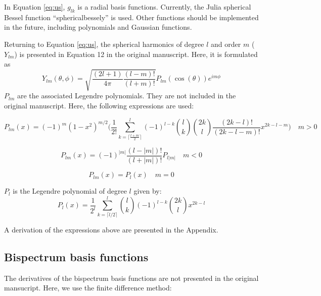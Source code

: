 \documentclass[12pt]{article}
\begin{document}
In Equation \ref{eq:us}, $g_{lk}$ is a radial basis functions. Currently, the Julia spherical Bessel function ``sphericalbessely'' is used. Other functions should be implemented in the future, including polynomials and Gaussian functions.

Returning to Equation \ref{eq:us}, the spherical harmonics of degree $l$ and order $m$ ($Y_{lm}$) is presented in Equation 12 in the original manuscript. Here, it is formulated as
\begin{equation}
 Y_{lm}(\theta,\phi) = \sqrt{\frac{(2l + 1)}{4 \pi} \frac{(l-m)!}{(l+m)!}} P_{lm}(\cos(\theta)) e^{i m \phi}
\end{equation}
$P_{lm}$ are the associated Legendre polynomials. They are not included in the original manuscript. Here, the following expressions are used:

\begin{equation}
    \label{eq:leg4}
    P_{lm}(x) = (-1)^m (1-x^2)^{m/2} \Bigg( \frac{1}{2!} \sum_{k=\lceil \frac{l+m}{2} \rceil}^l  (-1)^{l-k} {l \choose k} {2k \choose l} \frac{(2k-l)!}{(2k-l-m)!} x^{2k-l-m} \Bigg) \quad m >0
\end{equation}

\begin{equation}
    \label{eq:leg2}
    P_{lm} (x) = (-1)^{|m|} \frac{(l-|m|)!}{(l+|m|)!} P_{l|m|} \quad m < 0
\end{equation}

\begin{equation}
    \label{eq:leg5}
    P_{lm}(x) = P_l(x) \quad m = 0
\end{equation} 


$P_l$ is the Legendre polynomial of degree $l$ given by:
\begin{equation}
    \label{eq:fleg2}
    P_l(x) = \frac{1}{2^l} \sum_{k=\lceil l/2 \rceil}^l {l \choose k} (-1)^{l-k} {2k \choose l} x^{2k-l}
\end{equation}

A derivation of the expressions above are presented in the Appendix.

\subsection{Bispectrum basis functions}

The derivatives of the bispectrum basis functions are not presented in the original mansucript. Here, we use the finite difference method:
\end{document}
